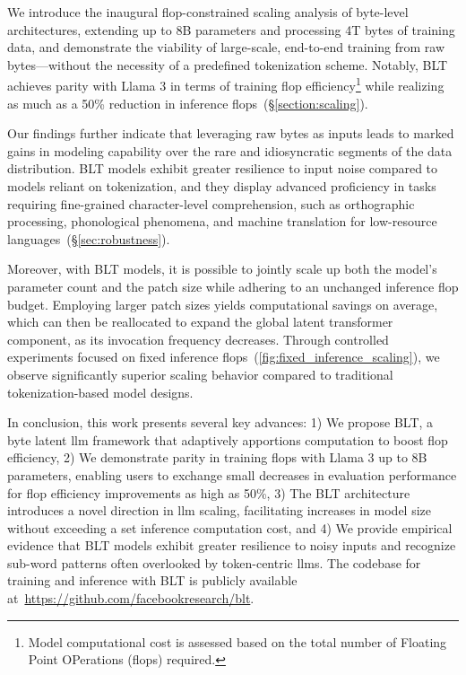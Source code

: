We introduce the inaugural flop-constrained scaling analysis of byte-level architectures, extending up to 8B parameters and processing 4T bytes of training data, and demonstrate the viability of large-scale, end-to-end training from raw bytes—without the necessity of a predefined tokenization scheme. Notably, {\textsc BLT} achieves parity with Llama 3 in terms of training flop efficiency\footnote{Model computational cost is assessed based on the total number of Floating Point OPerations (flops) required.} while realizing as much as a 50\% reduction in inference flops~(\S\ref{section:scaling}).

Our findings further indicate that leveraging raw bytes as inputs leads to marked gains in modeling capability over the rare and idiosyncratic segments of the data distribution. {\textsc BLT} models exhibit greater resilience to input noise compared to models reliant on tokenization, and they display advanced proficiency in tasks requiring fine-grained character-level comprehension, such as orthographic processing, phonological phenomena, and machine translation for low-resource languages~(\S\ref{sec:robustness}).

Moreover, with {\textsc BLT} models, it is possible to jointly scale up both the model’s parameter count and the patch size while adhering to an unchanged inference flop budget. Employing larger patch sizes yields computational savings on average, which can then be reallocated to expand the global latent transformer component, as its invocation frequency decreases. Through controlled experiments focused on fixed inference flops~(\autoref{fig:fixed_inference_scaling}), we observe significantly superior scaling behavior compared to traditional tokenization-based model designs.

In conclusion, this work presents several key advances: 1) We propose {\textsc BLT}, a byte latent llm framework that adaptively apportions computation to boost flop efficiency, 2) We demonstrate parity in training flops with Llama 3 up to 8B parameters, enabling users to exchange small decreases in evaluation performance for flop efficiency improvements as high as 50\%, 3) The {\textsc BLT} architecture introduces a novel direction in llm scaling, facilitating increases in model size without exceeding a set inference computation cost, and 4) We provide empirical evidence that {\textsc BLT} models exhibit greater resilience to noisy inputs and recognize sub-word patterns often overlooked by token-centric llms. The codebase for training and inference with {\textsc BLT} is publicly available at~\url{https://github.com/facebookresearch/blt}.

